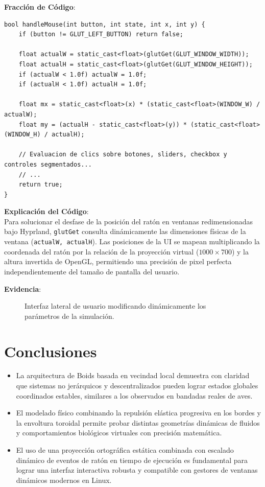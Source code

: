 \documentclass[11pt,a4paper]{article}
\begin{document}
\textbf{Fracción de Código}:
\begin{lstlisting}[caption={Coordenadas escaladas para el manejo del ratón en ui.cpp}, label={lst:mouse_scaling}]
bool handleMouse(int button, int state, int x, int y) {
    if (button != GLUT_LEFT_BUTTON) return false;

    float actualW = static_cast<float>(glutGet(GLUT_WINDOW_WIDTH));
    float actualH = static_cast<float>(glutGet(GLUT_WINDOW_HEIGHT));
    if (actualW < 1.0f) actualW = 1.0f;
    if (actualH < 1.0f) actualH = 1.0f;

    float mx = static_cast<float>(x) * (static_cast<float>(WINDOW_W) / actualW);
    float my = (actualH - static_cast<float>(y)) * (static_cast<float>(WINDOW_H) / actualH);
    
    // Evaluacion de clics sobre botones, sliders, checkbox y controles segmentados...
    // ...
    return true;
}
\end{lstlisting}

\textbf{Explicación del Código}: \\
Para solucionar el desfase de la posición del ratón en ventanas redimensionadas bajo Hyprland, \lstinline{glutGet} consulta dinámicamente las dimensiones físicas de la ventana (\lstinline{actualW, actualH}). Las posiciones de la UI se mapean multiplicando la coordenada del ratón por la relación de la proyección virtual ($1000 \times 700$) y la altura invertida de OpenGL, permitiendo una precisión de pixel perfecta independientemente del tamaño de pantalla del usuario.

\textbf{Evidencia}:
\begin{figure}[htbp]
    \centering
    \caption{Interfaz lateral de usuario modificando dinámicamente los parámetros de la simulación.}
    \label{fig:evidencia_punto8}
\end{figure}

\newpage

\section{Conclusiones}
\begin{itemize}
    \item La arquitectura de Boids basada en vecindad local demuestra con claridad que sistemas no jerárquicos y descentralizados pueden lograr estados globales coordinados estables, similares a los observados en bandadas reales de aves.
    \item El modelado físico combinando la repulsión elástica progresiva en los bordes y la envoltura toroidal permite probar distintas geometrías dinámicas de fluidos y comportamientos biológicos virtuales con precisión matemática.
    \item El uso de una proyección ortográfica estática combinada con escalado dinámico de eventos de ratón en tiempo de ejecución es fundamental para lograr una interfaz interactiva robusta y compatible con gestores de ventanas dinámicos modernos en Linux.
\end{itemize}
\end{document}
